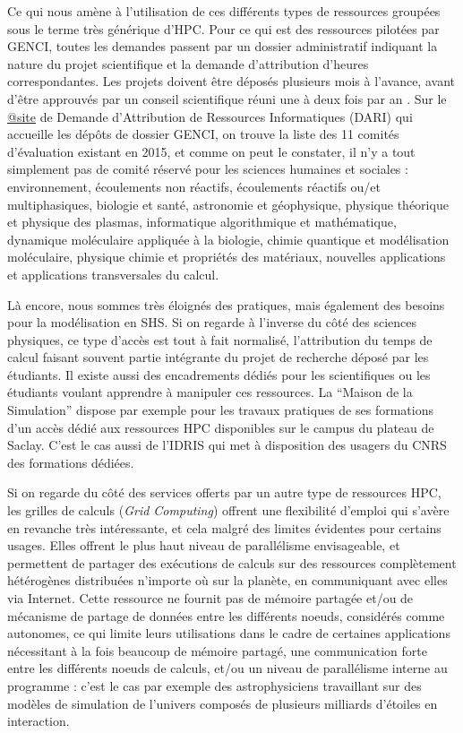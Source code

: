 Ce qui nous amène à l'utilisation de ces différents types de ressources groupées sous le terme très générique d'HPC. Pour ce qui est des ressources pilotées par GENCI, toutes les demandes passent par un dossier administratif indiquant la nature du projet scientifique et la demande d'attribution d'heures correspondantes. Les projets doivent être déposés plusieurs mois à l'avance, avant d'être approuvés par un conseil scientifique réuni une à deux fois par an \autocite{GENCI2015}. Sur le \href{https://www.edari.fr/}{@site} de Demande d'Attribution de Ressources Informatiques (DARI) qui accueille les dépôts de dossier GENCI, on trouve la liste des 11 comités d'évaluation existant en 2015, et comme on peut le constater, il n'y a tout simplement pas de comité réservé pour les sciences humaines et sociales : environnement, écoulements non réactifs, écoulements réactifs ou/et multiphasiques, biologie et santé, astronomie et géophysique, physique théorique et physique des plasmas, informatique algorithmique et mathématique, dynamique moléculaire appliquée à la biologie, chimie quantique et modélisation moléculaire, physique chimie et propriétés des matériaux, nouvelles applications et applications transversales du calcul.

Là encore, nous sommes très éloignés des pratiques, mais également des besoins pour la modélisation en SHS. Si on regarde à l'inverse du côté des sciences physiques, ce type d'accès est tout à fait normalisé, l'attribution du temps de calcul faisant souvent partie intégrante du projet de recherche déposé par les étudiants. Il existe aussi des encadrements dédiés pour les scientifiques ou les étudiants voulant apprendre à manipuler ces ressources. La \enquote{Maison de la Simulation} dispose par exemple pour les travaux pratiques de ses formations d'un accès dédié aux ressources HPC disponibles sur le campus du plateau de Saclay. C'est le cas aussi de l'IDRIS qui met à disposition des usagers du CNRS des formations dédiées.

Si on regarde du côté des services offerts par un autre type de ressources HPC, les grilles de calculs (\textit{Grid Computing}) offrent une flexibilité d'emploi qui s'avère en revanche très intéressante, et cela malgré des limites évidentes pour certains usages.
Elles offrent le plus haut niveau de parallélisme envisageable, et permettent de partager des exécutions de calculs sur des ressources complètement hétérogènes distribuées n'importe où sur la planète, en communiquant avec elles via Internet. Cette ressource ne fournit pas de mémoire partagée et/ou de mécanisme de partage de données entre les différents noeuds, considérés comme autonomes, ce qui limite leurs utilisations dans le cadre de certaines applications nécessitant à la fois beaucoup de mémoire partagé, une communication forte entre les différents noeuds de calculs, et/ou un niveau de parallélisme interne au programme : c'est le cas par exemple des astrophysiciens travaillant sur des modèles de simulation de l'univers composés de plusieurs milliards d'étoiles en interaction.

